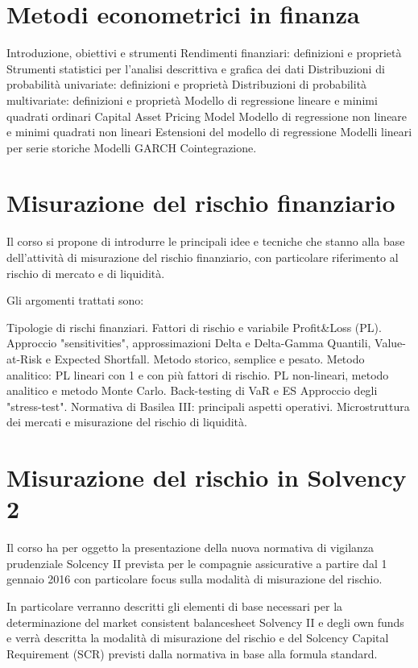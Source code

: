 \documentclass[a4paper,10pt]{article}
\begin{document}
\section{Metodi econometrici in finanza}
Introduzione, obiettivi e strumenti
Rendimenti finanziari: definizioni e proprietà
Strumenti statistici per l’analisi descrittiva e grafica dei dati
Distribuzioni di probabilità univariate: definizioni e proprietà
Distribuzioni di probabilità multivariate: definizioni e proprietà
Modello di regressione lineare e minimi quadrati ordinari
Capital Asset Pricing Model
Modello di regressione non lineare e minimi quadrati non lineari
Estensioni del modello di regressione
Modelli lineari per serie storiche
Modelli GARCH
Cointegrazione.

\section{Misurazione del rischio finanziario}
Il corso si propone di introdurre le principali idee e tecniche che stanno alla base dell'attività di misurazione del rischio finanziario, con particolare riferimento al rischio di mercato e di liquidità.

Gli argomenti trattati sono:

Tipologie di rischi finanziari.
Fattori di rischio e variabile Profit\&Loss (PL).
Approccio "sensitivities", approssimazioni Delta e Delta-Gamma Quantili, Value-at-Risk e Expected Shortfall.
Metodo storico, semplice e pesato.
Metodo analitico: PL lineari con 1 e con più fattori di rischio.
PL non-lineari, metodo analitico e metodo Monte Carlo.
Back-testing di VaR e ES Approccio degli "stress-test".
Normativa di Basilea III: principali aspetti operativi.
Microstruttura dei mercati e misurazione del rischio di liquidità.

\section{Misurazione del rischio in Solvency 2}
Il corso ha per oggetto la presentazione della nuova normativa di vigilanza prudenziale Solcency II prevista per le compagnie assicurative a partire dal 1 gennaio 2016 con particolare focus sulla modalità di misurazione del rischio.

In particolare verranno descritti gli elementi di base necessari per la determinazione del market consistent balancesheet Solvency II e degli own funds e verrà descritta la modalità di misurazione del rischio e del Solcency Capital Requirement (SCR) previsti dalla normativa in base alla formula standard.
\end{document}
